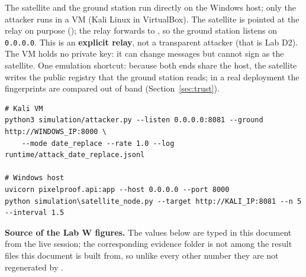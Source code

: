The satellite and the ground station run directly on the Windows host; only the attacker runs in a VM (Kali Linux in VirtualBox). The satellite is pointed at the relay on purpose (); the relay forwards to , so the ground station listens on \texttt{0.0.0.0}. This is an \textbf{explicit relay}, not a transparent attacker (that is Lab D2). The VM holds no private key: it can change messages but cannot sign as the satellite. One emulation shortcut: because both ends share the host, the satellite writes the public registry that the ground station reads; in a real deployment the fingerprints are compared out of band (Section~\ref{sec:trust}).
\begin{lstlisting}[style=sh]
# Kali VM
python3 simulation/attacker.py --listen 0.0.0.0:8081 --ground http://WINDOWS_IP:8000 \
    --mode date_replace --rate 1.0 --log runtime/attack_date_replace.jsonl

# Windows host
uvicorn pixelproof.api:app --host 0.0.0.0 --port 8000
python simulation\satellite_node.py --target http://KALI_IP:8081 --n 5 --interval 1.5
\end{lstlisting}

\begin{warnbox}
\textbf{Source of the Lab W figures.} The values below are typed in this document from the live session; the corresponding evidence folder is not among the result files this document is built from, so unlike every other number they are not regenerated by .
\end{warnbox}

